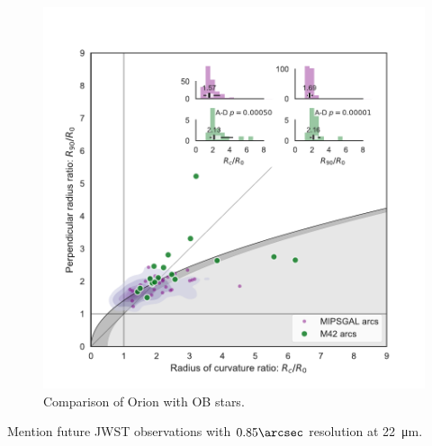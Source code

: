 \begin{figure}
  \centering
  \includegraphics[width=\linewidth]{figs/mipsgal-Rc-R90-vs-Orion}
  \caption[]{Comparison of Orion with OB stars.}
  \label{fig:ll-compare-mipsgal}
\end{figure}


Mention future JWST observations with \(0.85\arcsec\) resolution at \SI{22}{\um}. 


